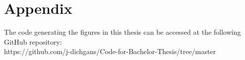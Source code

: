 \documentclass[%
thesis=student,%
coverpage=false,%
titlepage=false,%
headmarks=true, %
english,%
font=libertine, %
math=newpxtx, %
BCOR=5mm,%
coverBCOR=11mm%
]{tumbook}
\begin{document}
\appendix
\chapter{Appendix}
The code generating the figures in this thesis can be accessed at the following GitHub repository: \\
https://github.com/j-dichgans/Code-for-Bachelor-Thesis/tree/master


\backmatter{}
\listoffigures%
\listoftables%

\printbibliography{} %
\end{document}
